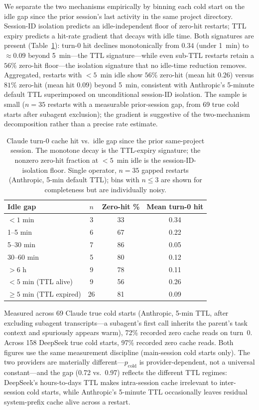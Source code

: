 \documentclass[11pt]{article}
\theoremstyle{definition}
\theoremstyle{remark}
\begin{document}
We separate the two mechanisms empirically by binning each cold start on the idle gap since the prior session's last activity in the same project directory. Session-ID isolation predicts an idle-independent floor of zero-hit restarts; TTL expiry predicts a hit-rate gradient that decays with idle time. Both signatures are present (Table~\ref{tab:idlegrad}): turn-0 hit declines monotonically from $0.34$ (under 1~min) to $\approx 0.09$ beyond 5~min---the TTL signature---while even sub-TTL restarts retain a $56\%$ zero-hit floor---the isolation signature that no idle-time reduction removes. Aggregated, restarts with $<5$~min idle show $56\%$ zero-hit (mean hit $0.26$) versus $81\%$ zero-hit (mean hit $0.09$) beyond 5~min, consistent with Anthropic's 5-minute default TTL superimposed on unconditional session-ID isolation. The sample is small ($n=35$ restarts with a measurable prior-session gap, from 69 true cold starts after subagent exclusion); the gradient is suggestive of the two-mechanism decomposition rather than a precise rate estimate.

\begin{table}[ht]
\centering
\caption{Claude turn-0 cache hit vs.\ idle gap since the prior same-project session. The monotone decay is the TTL-expiry signature; the nonzero zero-hit fraction at $<5$~min idle is the session-ID-isolation floor. Single operator, $n=35$ gapped restarts (Anthropic, 5-min default TTL); bins with $n\le3$ are shown for completeness but are individually noisy.}
\label{tab:idlegrad}
\begin{tabular}{l c c c}
\toprule
Idle gap & $n$ & Zero-hit \% & Mean turn-0 hit \\
\midrule
$<1$ min      & 3 & 33 & 0.34 \\
1--5 min      & 6 & 67 & 0.22 \\
5--30 min     & 7 & 86 & 0.05 \\
30--60 min    & 5 & 80 & 0.12 \\
$>6$ h        & 9 & 78 & 0.11 \\
\midrule
$<5$ min (TTL alive)   & 9  & 56 & 0.26 \\
$\ge 5$ min (TTL expired) & 26 & 81 & 0.09 \\
\bottomrule
\end{tabular}
\end{table}

Measured across 69 Claude true cold starts (Anthropic, 5-min TTL, after excluding subagent transcripts---a subagent's first call inherits the parent's task context and spuriously appears warm), 72\% recorded zero cache reads on turn~0. Across 158 DeepSeek true cold starts, 97\% recorded zero cache reads. Both figures use the same measurement discipline (main-session cold starts only). The two providers are materially different---$p_{\text{cold}}$ is provider-dependent, not a universal constant---and the gap (0.72 vs.\ 0.97) reflects the different TTL regimes: DeepSeek's hours-to-days TTL makes intra-session cache irrelevant to inter-session cold starts, while Anthropic's 5-minute TTL occasionally leaves residual system-prefix cache alive across a restart.
\end{document}
